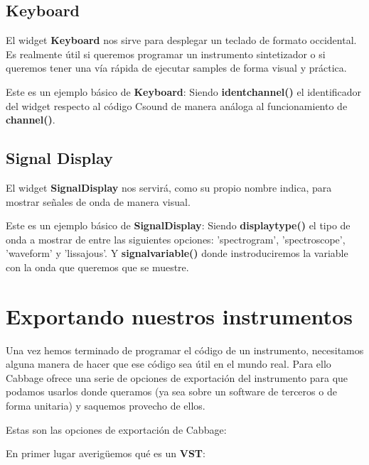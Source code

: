 \pagebreak
\subsection{Keyboard}
El widget \textbf{Keyboard} nos sirve para desplegar un teclado de formato occidental. Es realmente útil si queremos programar un instrumento sintetizador o si queremos tener una vía rápida de ejecutar samples de forma visual y práctica.

Este es un ejemplo básico de \textbf{Keyboard}:
Siendo \textbf{identchannel()} el identificador del widget respecto al código Csound de manera análoga al funcionamiento de \textbf{channel()}.

\subsection{Signal Display}
El widget \textbf{SignalDisplay} nos servirá, como su propio nombre indica, para mostrar señales de onda de manera visual.

Este es un ejemplo básico de \textbf{SignalDisplay}:
Siendo \textbf{displaytype()} el tipo de onda a mostrar de entre las siguientes opciones: 'spectrogram', 'spectroscope', 'waveform' y 'lissajous'. Y \textbf{signalvariable()} donde instroduciremos la variable con la onda que queremos que se muestre.

\section{Exportando nuestros instrumentos}\label{sec:ExportCabbage}

Una vez hemos terminado de programar el código de un instrumento, necesitamos alguna manera de hacer que ese código sea útil en el mundo real. Para ello Cabbage ofrece una serie de opciones de exportación del instrumento para que podamos usarlos donde queramos (ya sea sobre un software de terceros o de forma unitaria) y saquemos provecho de ellos.

Estas son las opciones de exportación de Cabbage:


En primer lugar averigüemos qué es un \textbf{VST}: 


